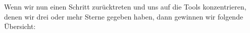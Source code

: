 %
%
%


Wenn wir nun einen Schritt zurücktreten und uns auf die
Tools konzentrieren, denen wir drei oder mehr Sterne gegeben haben, dann
gewinnen wir folgende Übersicht:



